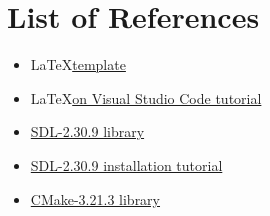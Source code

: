 \section{List of References}
\label{sec:references-list}

\begin{itemize}
    \item \LaTeX \space \href{https://github.com/khongsomeo/hcmus-unofficial-report-template}{template}
    \item \LaTeX \space \href{https://youtu.be/4lyHIQl4VM8}{on Visual Studio Code tutorial}
    \item \href{https://github.com/libsdl-org/SDL/releases/tag/release-2.30.9}{SDL-2.30.9 library}
    \item \href{https://lazyfoo.net/tutorials/SDL}{SDL-2.30.9 installation tutorial}
    \item \href{https://cmake.org/download}{CMake-3.21.3 library}
\end{itemize}